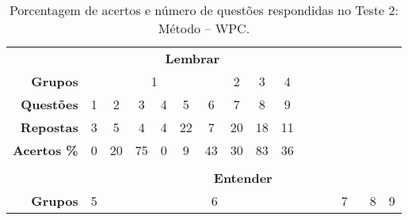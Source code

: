 \begin{table}[!ht]
    \centering
    \caption{Porcentagem de acertos e número de questões respondidas no Teste 2: Método -- WPC.}
    \label{tab:respostas_atualizada_teste2}
    \begin{tabular}{rccccclllllllllll}
    \cline{1-10}
    \multicolumn{1}{|l|}{} & \multicolumn{9}{c|}{\cellcolor{green!25}\textbf{Lembrar}} &  &  &  &  &  &  &  \\ \cline{1-10}
    \multicolumn{1}{|r|}{\textbf{Grupos}} & \multicolumn{6}{c|}{1} & \multicolumn{1}{c|}{2} & \multicolumn{1}{c|}{3} & \multicolumn{1}{c|}{4} &  &  &  &  &  &  &  \\ \cline{1-10}
    \multicolumn{1}{|r|}{\cellcolor[HTML]{D9D9D9}\textbf{Questões}} & \multicolumn{1}{c|}{\cellcolor[HTML]{D9D9D9}1} & \multicolumn{1}{c|}{\cellcolor[HTML]{D9D9D9}2} & \multicolumn{1}{c|}{\cellcolor[HTML]{D9D9D9}3} & \multicolumn{1}{c|}{\cellcolor[HTML]{D9D9D9}4} & \multicolumn{1}{c|}{\cellcolor[HTML]{D9D9D9}5} & \multicolumn{1}{c|}{\cellcolor[HTML]{D9D9D9}6} & \multicolumn{1}{c|}{\cellcolor[HTML]{D9D9D9}7} & \multicolumn{1}{c|}{\cellcolor[HTML]{D9D9D9}8} & \multicolumn{1}{c|}{\cellcolor[HTML]{D9D9D9}9} &  &  &  &  &  &  &  \\ 
    \multicolumn{1}{|r|}{\textbf{Repostas}} & \multicolumn{1}{c|}{3} & \multicolumn{1}{c|}{5} & \multicolumn{1}{c|}{4} & \multicolumn{1}{c|}{4} & \multicolumn{1}{c|}{22} & \multicolumn{1}{c|}{7} & \multicolumn{1}{c|}{20} & \multicolumn{1}{c|}{18} & \multicolumn{1}{c|}{11} &  &  &  &  &  &  &  \\ 
    \multicolumn{1}{|r|}{\cellcolor[HTML]{D9D9D9}\textbf{Acertos \%}} & \multicolumn{1}{c|}{\cellcolor[HTML]{D9D9D9}0} & \multicolumn{1}{c|}{\cellcolor[HTML]{D9D9D9}20} & \multicolumn{1}{c|}{\cellcolor[HTML]{D9D9D9}75} & \multicolumn{1}{c|}{\cellcolor[HTML]{D9D9D9}0} & \multicolumn{1}{c|}{\cellcolor[HTML]{D9D9D9}9} & \multicolumn{1}{c|}{\cellcolor[HTML]{D9D9D9}43} & \multicolumn{1}{c|}{\cellcolor[HTML]{D9D9D9}30} & \multicolumn{1}{c|}{\cellcolor[HTML]{D9D9D9}83} & \multicolumn{1}{c|}{\cellcolor[HTML]{D9D9D9}36} &  &  &  &  &  &  &  \\ \cline{1-10}
    \multicolumn{1}{l}{} & \multicolumn{1}{l}{} & \multicolumn{1}{l}{} & \multicolumn{1}{l}{} & \multicolumn{1}{l}{} & \multicolumn{1}{l}{} &  &  &  &  &  &  &  &  &  &  &  \\ \hline
    \multicolumn{1}{|l|}{} & \multicolumn{16}{c|}{\cellcolor{yellow!25}\textbf{Entender}} \\ \hline
    \multicolumn{1}{|r|}{\textbf{Grupos}} & \multicolumn{1}{c|}{5} & \multicolumn{10}{c|}{6} & \multicolumn{3}{c|}{7} & \multicolumn{1}{c|}{8} & \multicolumn{1}{c|}{9} \\ \hline

\end{tabular}
\end{table}
